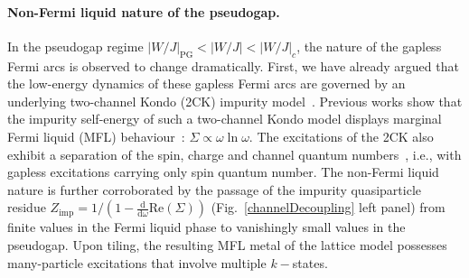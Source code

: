 \documentclass[%
 reprint,
superscriptaddress,
groupedaddress,
 amsmath,amssymb,
 aps,
prl
]{revtex4-2}
\begin{document}
\paragraph*{Non-Fermi liquid nature of the pseudogap.} In the pseudogap regime $|W/J|_{\text{PG}} < |W/J| < |W/J|_{c}$, the nature of the %
gapless Fermi arcs is observed to change dramatically. 
First, we have already argued that the low-energy dynamics of these gapless Fermi arcs are governed by an underlying %
two-channel Kondo (2CK) impurity model~\cite{Tsvelick_weigmann_mchannel_1985,emery_kivelson}.
Previous works 
show that the impurity self-energy of such a two-channel Kondo model displays marginal Fermi liquid (MFL) behaviour~\cite{Coleman_tsvelik,Schofield1997,Patra2023MCK}: $\Sigma \propto \omega \ln \omega$. The excitations of the 2CK also exhibit a separation of the spin, charge and channel quantum numbers~\cite{affleck1992}, i.e., with gapless excitations carrying only spin quantum number. The non-Fermi liquid nature
is further corroborated by the passage of the impurity quasiparticle residue $Z_\text{imp} = 1/(1 - \frac{\text{d}}{\text{d}\omega}\text{Re}(\Sigma))$ (Fig.~\ref{channelDecoupling} left panel) from finite values in the Fermi liquid phase to vanishingly small values in the pseudogap.
Upon tiling, 
the resulting MFL metal of the lattice model 
possesses many-particle excitations that involve 
multiple \(k-\)states.
\end{document}
